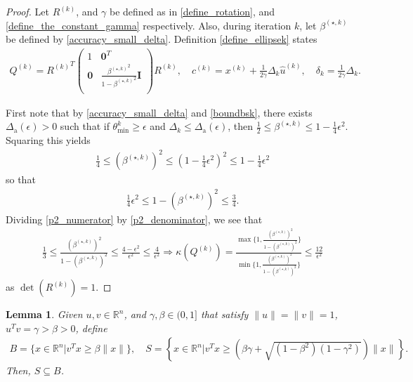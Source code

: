 \documentclass{article}
\newtheorem{lemma}[theorem]{Lemma}
\theoremstyle{case}
\numberwithin{theorem}{subsection}
\newcommand{\bs}{{\beta^{(\star, k)}}}
\newcommand{\ck}{{c^{(k)}}}
\newcommand{\dacco}{{\Delta_{\textrm{a}}}}
\newcommand{\dk}{\Delta_k}
\newcommand{\huk}{{{\hat u}^{(k)}}}
\newcommand{\qk}{{Q^{(k)}}}
\newcommand{\Rn}{\mathbb R^n}
\newcommand{\rotk}{{R^{(k)}}}
\newcommand{\sdk}{{\delta_k}}
\newcommand{\thetamink}{{\theta^k_{\textrm{min}}}}
\newcommand{\xk}{{x^{(k)}}}
\begin{document}
\begin{proof}
Let $\rotk$, and $\gamma$ be defined as in \cref{define_rotation}, and \cref{define_the_constant_gamma} respectively.
Also, during iteration $k$, let $\bs$ be defined by \cref{accuracy_small_delta}.
Definition \cref{define_ellipsek} states
\begin{align*}
\qk = \rotk^T \begin{pmatrix}
1 & \boldsymbol0^T \\
\boldsymbol 0 & \frac{\bs^2}{1 - \bs^2} \boldsymbol I \\
\end{pmatrix} \rotk, \quad
\ck = \xk  + \frac 1 {2\gamma} \dk\huk, \quad
\sdk = \frac 1 {2\gamma} \dk.
\end{align*}

First note that by \cref{accuracy_small_delta} and \cref{boundbsk}, there exists $\dacco(\epsilon) > 0$ such that if 
$\thetamink \ge \epsilon$ and $\dk \le \dacco(\epsilon)$, then
$\frac {1} 2 \le \bs \le 1 - \frac 1 4 \epsilon^2$.
Squaring this yields
\begin{align}
\frac {1} 4 \le \left(\bs\right)^2 \le \left(1 - \frac 1 4 \epsilon^2\right)^2 \le 1 - \frac 1 4 \epsilon^2 \label{p2_numerator}
\end{align}
so that
\begin{align}
\frac 1 4 \epsilon^2 \le 1 - \left(\bs\right)^2 \le \frac 3 4. \label{p2_denominator}
\end{align}
Dividing \cref{p2_numerator} by \cref{p2_denominator}, we see that
\begin{align*}
\frac 1 3
\le \frac{\left(\bs\right)^2}{1 - \left(\bs\right)^2}
\le \frac {4 - \epsilon^2}{\epsilon^2} \le \frac {4}{\epsilon^2}
\Longrightarrow 
\kappa(\qk) 
= \frac{\max\{1, \frac{\left(\bs\right)^2}{1 - \left(\bs\right)^2}\}}{\min\{1, \frac{\left(\bs\right)^2}{1 - \left(\bs\right)^2}\}} 
\le \frac {12}{\epsilon^2}
\end{align*}
as $\det(\rotk) = 1$.
\end{proof}




\begin{lemma}
\label{cone_subset_cone}
Given $u, v \in \Rn$, and $\gamma, \beta \in (0, 1]$ that satisfy $\|u\| = \|v\|= 1$, $u^Tv = \gamma > \beta > 0$, define
\begin{align*}
B = \{x\in\Rn | {v}^Tx \ge \beta\|x\|\}, \quad
S = \left\{x\in\Rn \bigg| v^Tx \ge \left(\beta\gamma + \sqrt{(1 - \beta^2)\left(1 - \gamma^2\right)}\right)\|x\| \right\}. 
\end{align*}
Then, $S \subseteq B$.
\end{lemma}
\end{document}
